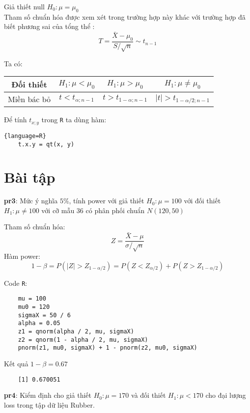 Giả thiết null $H_0: \mu = \mu_0$ \\
Tham số chuẩn hóa được xem xét trong trường hợp này khác với trường hợp đã biết phương sai của tổng thể
:
\begin{equation}
    T = \frac{\bar{X} - \mu_0}{S/ \sqrt{n}} \sim t_{n - 1}    
\end{equation}


Ta có:

\begin{center}
    \begin{tabular}{| c | c | c | c |}
        \hline
        Đối thiết & $H_1: \mu < \mu_0$ & $H_1: \mu > \mu_0$ & $H_1: \mu \neq \mu_0$ \\
        \hline
        Miền bác bỏ & $t < t_{\alpha; n - 1}$ & $t > t_{1-\alpha; n - 1}$ & $\lvert t \rvert > t_{1 - \alpha / 2; n - 1}$ \\
        \hline
    \end{tabular}
\end{center}

Để tính $t_{x; y}$ trong \lstinline{R} ta dùng hàm:

\begin{lstlisting}{language=R}
    t.x.y = qt(x, y)
\end{lstlisting}

\section{Bài tập}
\textbf{pr3}: Mức ý nghĩa $5\%$, tính power với giả thiết $H_0: \mu = 100$ với đối 
thiết $H_1: \mu \neq 100$ với cỡ mẫu 36 có phân phối chuẩn $N(120, 50)$

Tham số chuẩn hóa: 
$$Z = \frac{\bar{X} - \mu}{\sigma / \sqrt{n}}$$
Hàm power: 
$$1 - \beta = P(|Z| > Z_{1 - \alpha / 2}) = P(Z < Z_{\alpha / 2}) + P(Z > Z_{1 - \alpha/2})$$

Code \lstinline{R}:
\begin{lstlisting}
    mu = 100
    mu0 = 120
    sigmaX = 50 / 6
    alpha = 0.05
    z1 = qnorm(alpha / 2, mu, sigmaX)
    z2 = qnorm(1 - alpha / 2, mu, sigmaX)
    pnorm(z1, mu0, sigmaX) + 1 - pnorm(z2, mu0, sigmaX)
\end{lstlisting}

Kết quả $1- \beta = 0.67$
\begin{lstlisting}
    [1] 0.670051
\end{lstlisting}

\textbf{pr4}: Kiểm định cho giả thiết $H_0: \mu = 170$ và đối thiết $H_1: \mu < 170$
cho đại lượng loss trong tập dữ liệu Rubber.

